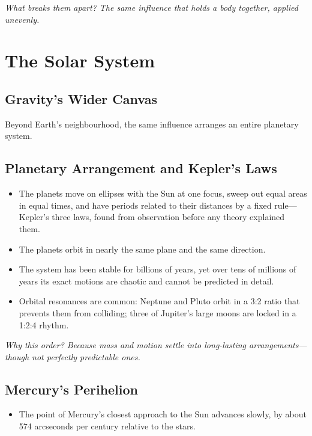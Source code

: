 \documentclass[11pt,a4paper]{article}
\newcommand{\why}[1]{\par\textit{#1}\par}
\begin{document}
\why{What breaks them apart? The same influence that holds a body together, applied unevenly.}

\section{The Solar System}

\subsection{Gravity's Wider Canvas}

Beyond Earth's neighbourhood, the same influence arranges an entire planetary system.

\subsection{Planetary Arrangement and Kepler's Laws}

\begin{itemize}
  \item The planets move on ellipses with the Sun at one focus, sweep out equal areas in equal times, and have periods related to their distances by a fixed rule---Kepler's three laws, found from observation before any theory explained them.
  \item The planets orbit in nearly the same plane and the same direction.
  \item The system has been stable for billions of years, yet over tens of millions of years its exact motions are chaotic and cannot be predicted in detail.
  \item Orbital resonances are common: Neptune and Pluto orbit in a 3:2 ratio that prevents them from colliding; three of Jupiter's large moons are locked in a 1:2:4 rhythm.
\end{itemize}

\why{Why this order? Because mass and motion settle into long-lasting arrangements---though not perfectly predictable ones.}

\subsection{Mercury's Perihelion}

\begin{itemize}
  \item The point of Mercury's closest approach to the Sun advances slowly, by about 574 arcseconds per century relative to the stars.
\end{itemize}
\end{document}
